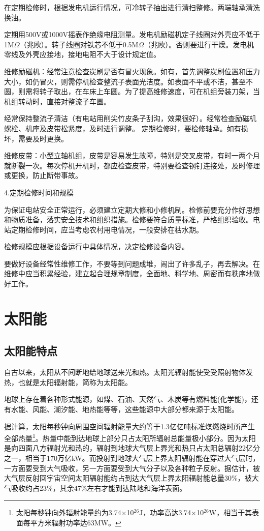 \documentclass{ctexbook}
\begin{document}
在定期检修时，根据发电机运行情况，可冷转子抽出进行清扫整修。两端轴承清洗换油。

定期用500V或1000V摇表作绝缘电阻测量。发电机励磁机定子线圈对外壳应不低于1M$\Omega$（兆欧）。转子线圈对铁芯不低于0.5M$\Omega$（兆欧）。否则要进行干燥。发电机零线及外壳应接地，接地电阻不大于设计规定值。

维修励磁机：经常注意检查炭刷是否有冒火现象。如有，首先调整炭刷位置和压力大小，如仍冒火，则需停机检查整流子表面光洁度。如表面不平或不洁，甚至不圆，则需将转子取出，在车床上车圆。为了提高维修速度，可在机组旁装刀架，当机组转动时，直接对整流子车圆。

经常保持整流子清洁（有电站用削尖竹皮条子刮沟，效果很好）。经常检查励磁机螺栓、机座及皮带松紧度，及时进行调整。
定期检修时，要检修轴承。如有损坏，需要及时更换。

维修皮带：小型立轴机组，皮带是容易发生故障，特别是交叉皮带，有时一两个月就断裂一次。每次停机开机时，都应检查皮带，特别要检查钢钉连接处，及时修理或更换，防止断带事故。

4.定期检修时间和规模

为保证电站安全正常运行，必须建立定期大修和小修机制。检修前要充分作好思想和物质准备，落实安全技术和组织措施。检修要符合质量标准，严格组织验收。电站定期检修时间，应当考虑农村用电情况，一般安排在枯水期。

检修规模应根据设备运行中具体情况，决定检修设备内容。

要做好设备经常性维修工作，不要等到问题成堆，闹出了许多乱子，再去解决。在维修中应当积累经验，建立起合理规章制度，全面地、科学地、周密而有秩序地做好工作。

\section{太阳能}
\subsection{太阳能特点}
自古以来，太阳从不间断地给地球送来光和热。太阳光辐射能使受受照射物体发热，也就是太阳辐射能，简称为太阳能。

地球上存在着各种形式能源，如煤、石油、天然气、木炭等有燃料能(化学能)，还有水能、风能、潮汐能、地热能等等，这些能源中大部分都来源于太阳能。

据计算，太阳每秒钟向周围空间辐射能量大约等于1.3亿亿吨标准煤燃烧时所产生全部热量\footnote{太阳每秒钟向外辐射能量约为3.74$\times$10$^{26}$J，功率高达3.74$\times$10$^{26}$W，相当于其表面每平方米辐射功率达63MW。}。热量中能到达地球上部分只占太阳所辐射总能量极小部分。因为太阳是向四面八方辐射光和热的，辐射到地球大气层上界光和热只占太阳总辐射22亿分之一，相当于170万亿kW。而投射到地球大气层上界太阳辐射能在穿过大气层时，一方面要受到大气吸收，另一方面要受到大气分子以及各种粒子反射。据估计，被大气层反射回宇宙空间太阳辐射能约占到达大气层上界太阳辐射能总量30\%，被大气吸收约占23\%，其余47\%左右才能到达陆地和海洋表面。
\end{document}
